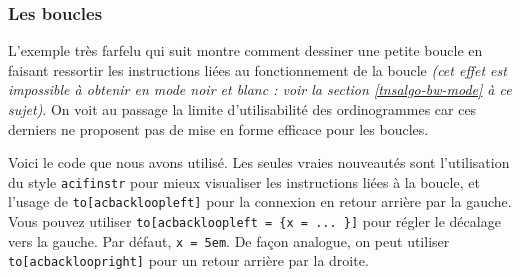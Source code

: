 \documentclass[12pt,a4paper]{article}
\begin{document}


\subsubsection{Les boucles}

L'exemple très farfelu qui suit montre comment dessiner une petite boucle en faisant ressortir les instructions liées au fonctionnement de la boucle \emph{(cet effet est impossible à obtenir en mode noir et blanc : voir la section \ref{tnsalgo-bw-mode} à ce sujet)}.
On voit au passage la limite d'utilisabilité des ordinogrammes car ces derniers ne proposent pas de mise en forme efficace pour les boucles.


\begin{center}
    \small
    
\end{center}


Voici le code que nous avons utilisé. Les seules vraies nouveautés sont l'utilisation du style \verb+acifinstr+ pour mieux visualiser les instructions liées à la boucle, et l'usage de \verb+to[acbackloopleft]+ pour la connexion en retour arrière par la gauche.
Vous pouvez utiliser \verb+to[acbackloopleft = {x = ... }]+  pour régler le décalage vers la gauche.
Par défaut, \verb+x = 5em+.
De façon analogue, on peut utiliser \verb+to[acbackloopright]+ pour un retour arrière par la droite. 

\medskip

\end{document}
